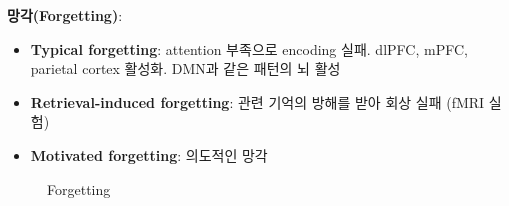 \documentclass{beamer}
\begin{document}
\begin{frame}
  \textbf{망각(Forgetting)}:
  \begin{minipage}{0.5\textwidth}
    \begin{itemize}
      \small
      \item \textbf{Typical forgetting}: attention 부족으로 encoding 실패. dlPFC, mPFC, parietal cortex 활성화. DMN과 같은 패턴의 뇌 활성
      \item \textbf{Retrieval-induced forgetting}: 관련 기억의 방해를 받아 회상 실패 (fMRI 실험)
      \item \textbf{Motivated forgetting}: 의도적인 망각
    \end{itemize}
    \hfill
  \end{minipage}%
  \begin{minipage}{0.5\textwidth}
    \vspace{-2em}
    \begin{figure}
      \centering
      \qquad
      \vspace{-0.5em}
      \caption{Forgetting}

    \end{figure}
  \end{minipage}
  
\end{frame}
\end{document}
